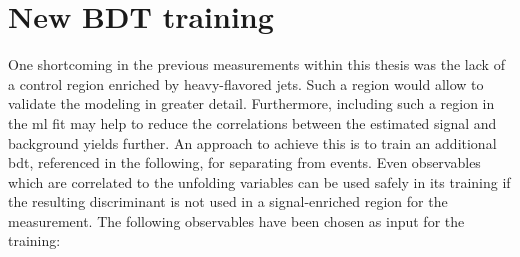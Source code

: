 
\clearpage 

\section{New BDT training}

One shortcoming in the previous measurements within this thesis was the lack of a \wjets control region enriched by heavy-flavored jets. Such a region would allow to validate the \wjets modeling in greater detail. Furthermore, including such a region in the \gls{ml} fit may help to reduce the correlations between the estimated signal and background yields further. An approach to achieve this is to train an additional \gls{bdt}, referenced \bdttt in the following, for separating \wjets from \ttbar events. Even observables which are correlated to the unfolding variables can be used safely in its training if the resulting discriminant is not used in a signal-enriched region for the measurement. The following observables have been chosen as input for the training:

